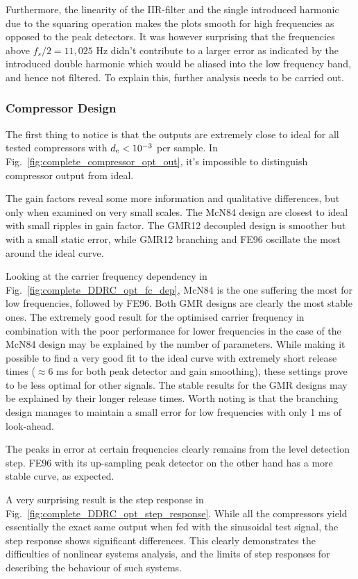\documentclass[../main2.tex]{subfiles}
\begin{document}
Furthermore, the linearity of the IIR-filter and the single introduced harmonic due to the squaring operation makes the plots smooth for high frequencies as opposed to the peak detectors. It was however surprising that the frequencies above $f_s/2=11,025$ Hz didn't contribute to a larger error as indicated by the introduced double harmonic which would be aliased into the low frequency band, and hence not filtered. To explain this, further analysis needs to be carried out.


\subsubsection{Compressor Design}
The first thing to notice is that the outputs are extremely close to ideal for all tested compressors with $d_\text{e} < 10^{-3}$ per sample. In Fig.~\ref{fig:complete_compressor_opt_out}, it's impossible to distinguish compressor output from ideal.

The gain factors reveal some more information and qualitative differences, but only when examined on very small scales. The McN84 design are closest to ideal with small ripples in gain factor. The GMR12 decoupled design is smoother but with a small static error, while GMR12 branching and FE96 oscillate the most around the ideal curve.

Looking at the carrier frequency dependency in Fig.~\ref{fig:complete_DDRC_opt_fc_dep}, McN84 is the one suffering the most for low frequencies, followed by FE96. Both GMR designs are clearly the most stable ones. The extremely good result for the optimised carrier frequency in combination with the poor performance for lower frequencies in the case of the McN84 design may be explained by the number of parameters. While making it possible to find a very good fit to the ideal curve with extremely short release times ($\approx 6$ ms for both peak detector and gain smoothing), these settings prove to be less optimal for other signals. The stable results for the GMR designs may be explained by their longer release times. Worth noting is that the branching design manages to maintain a small error for low frequencies with only 1 ms of look-ahead. 

The peaks in error at certain frequencies clearly remains from the level detection step. FE96 with its up-sampling peak detector on the other hand has a more stable curve, as expected.

A very surprising result is the step response in Fig.~\ref{fig:complete_DDRC_opt_step_response}. While all the compressors yield essentially the exact same output when fed with the sinusoidal test signal, the step response shows significant differences. This clearly demonstrates the difficulties of nonlinear systems analysis, and the limits of step responses for describing the behaviour of such systems.
\end{document}
